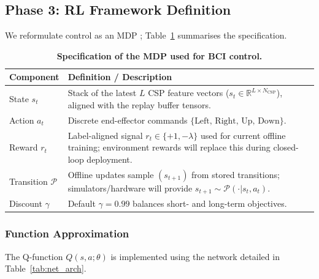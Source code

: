 \documentclass[twocolumn]{article}
\begin{document}
\subsection{Phase 3: RL Framework Definition}

We reformulate control as an MDP \cite{nallani2024rleegnet}; Table~\ref{tab:mdp_spec} summarises the specification.

\begin{table}[t]
    \centering
    \caption{\textbf{Specification of the MDP used for BCI control.}}
    \label{tab:mdp_spec}
    \renewcommand{\arraystretch}{1.18}
    \begin{tabular}{@{}p{} p{}@{}}
        \toprule
        Component & Definition / Description \\
        \midrule
        State $s_t$ & Stack of the latest $L$ CSP feature vectors ($s_t \in \mathbb{R}^{L\times N_{\text{CSP}}}$), aligned with the replay buffer tensors. \\
        Action $a_t$ & Discrete end-effector commands $\{\text{Left, Right, Up, Down}\}$. \\
        Reward $r_t$ & Label-aligned signal $r_t \in \{+1,-\lambda\}$ used for current offline training; environment rewards will replace this during closed-loop deployment. \\
        Transition $\mathcal{P}$ & Offline updates sample $(s_{t+1})$ from stored transitions; simulators/hardware will provide $s_{t+1}\sim\mathcal{P}(\cdot|s_t,a_t)$. \\
        Discount $\gamma$ & Default $\gamma = 0.99$ balances short- and long-term objectives. \\
        \bottomrule
    \end{tabular}
\end{table}

\subsubsection{Function Approximation}
The Q-function $Q(s,a;\theta)$ is implemented using the network detailed in Table~\ref{tab:net_arch}.

\end{document}
